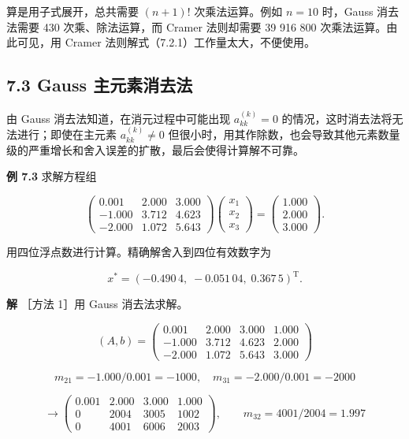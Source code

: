 \documentclass[
  10pt,
  fontset=fandol]{ctexart}
\begin{document}
算是用子式展开，总共需要 \((n+1)!\) 次乘法运算。例如 \(n=10\) 时，Gauss 消去法需要 430 次乘、除法运算，而 Cramer 法则却需要 39 916 800 次乘法运算。由此可见，用 Cramer 法则解式（7.2.1）工作量太大，不便使用。

\subsection{7.3 Gauss 主元素消去法}\label{gauss-ux4e3bux5143ux7d20ux6d88ux53bbux6cd5}

由 Gauss 消去法知道，在消元过程中可能出现 \(a_{kk}^{(k)}=0\) 的情况，这时消去法将无法进行；即使在主元素 \(a_{kk}^{(k)}\ne0\) 但很小时，用其作除数，也会导致其他元素数量级的严重增长和舍入误差的扩散，最后会使得计算解不可靠。

\textbf{例 7.3} 求解方程组

\[
\begin{pmatrix}
0.001&2.000&3.000\\
-1.000&3.712&4.623\\
-2.000&1.072&5.643
\end{pmatrix}
\begin{pmatrix}x_1\\x_2\\x_3\end{pmatrix}
=\begin{pmatrix}1.000\\2.000\\3.000\end{pmatrix}.
\]

用四位浮点数进行计算。精确解舍入到四位有效数字为

\[x^*=(-0.490\,4,\;-0.051\,04,\;0.367\,5)^{\mathrm T}.\]

\textbf{解} ［方法 1］用 Gauss 消去法求解。

\[
(A,b)=\left(\begin{array}{rrr|r}
0.001&2.000&3.000&1.000\\
-1.000&3.712&4.623&2.000\\
-2.000&1.072&5.643&3.000
\end{array}\right)
\]

\[m_{21}=-1.000/0.001=-1000,\quad m_{31}=-2.000/0.001=-2000\]

\[
\longrightarrow\left(\begin{array}{rrr|r}
0.001&2.000&3.000&1.000\\
0&2004&3005&1002\\
0&4001&6006&2003
\end{array}\right),\qquad m_{32}=4001/2004=1.997
\]
\end{document}
